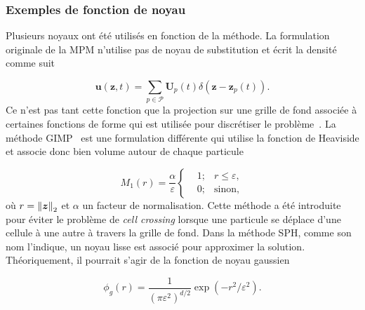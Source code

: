 \subsubsection{Exemples de fonction de noyau}

Plusieurs noyaux ont été utilisés en fonction de la méthode. La formulation originale de la MPM n'utilise pas de noyau de substitution et écrit la densité comme suit

\begin{equation*}
    \bm{u}(\bm{z}, t) = \sum_{p \in \mathcal P} \bm{U}_p(t) \delta (\bm{z}-\bm{z}_p(t)).
\end{equation*}Ce n'est pas tant cette fonction que la projection sur une grille de fond associée à certaines fonctions de forme qui est utilisée pour discrétiser le problème~\cite{sulsky_particle_1994}. La méthode GIMP~\cite{bardenhagen_generalized_2004} est une formulation différente qui utilise la fonction de Heaviside et associe donc bien volume autour de chaque particule

\begin{equation*}
    M_1(r) = \frac{\alpha}{\varepsilon}\left\{\begin{aligned}
         & 1; & r \leq \varepsilon, \\
         & 0; & \text{sinon},
    \end{aligned}
    \right.
\end{equation*}où $r = \left\lVert \bm{z} \right\rVert_2$ et $\alpha$ un facteur de normalisation. Cette méthode a été introduite pour éviter le problème de \textit{cell crossing} lorsque une particule se déplace d'une cellule à une autre à travers la grille de fond. Dans la méthode SPH, comme son nom l'indique, un noyau lisse est associé pour approximer la solution. Théoriquement, il pourrait s'agir de la fonction de noyau gaussien

\begin{equation*}
    \phi_g(r) = \frac{1}{{(\pi \varepsilon^2)}^{d/2}} \exp(-r^2/\varepsilon^2).
\end{equation*}

